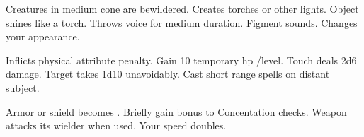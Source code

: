 \begin{swspelllist}
   Creatures in medium cone are bewildered.
   Creates torches or other lights.
   Object shines like a torch.
   Throws voice for medium duration.
   Figment sounds.
   Changes your appearance.

   Inflicts  physical attribute penalty.
   Gain 10 temporary hp /level.
   Touch deals 2d6 damage.
   Target takes 1d10 unavoidably.
   Cast short range spells on distant subject.

   Armor or shield becomes .
   Briefly gain bonus to Concentation checks.
   Weapon attacks its wielder when used.
   Your speed doubles.
\end{swspelllist}


